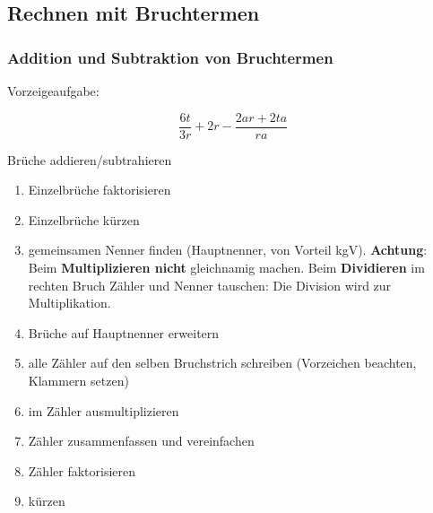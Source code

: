 \newpage
\subsection{Rechnen mit Bruchtermen}

\subsubsection{Addition und Subtraktion von Bruchtermen}

Vorzeigeaufgabe:

$$\frac{6t}{3r} + 2r - \frac{2ar+2ta}{ra}$$



\begin{rezept}{Brüche addieren/subtrahieren}{}\label{bruchtermeRezept}
\begin{enumerate}
	\item Einzelbrüche faktorisieren
	\item Einzelbrüche kürzen
	\item gemeinsamen Nenner finden (Hauptnenner, von Vorteil
	kgV). \textbf{Achtung}: Beim \textbf{Multiplizieren nicht}
	gleichnamig machen. Beim \textbf{Dividieren} im rechten Bruch Zähler
	und Nenner tauschen: Die Division wird zur Multiplikation.
	\item Brüche auf Hauptnenner erweitern
	\item alle Zähler auf den selben Bruchstrich schreiben (Vorzeichen beachten, Klammern setzen)
	\item im Zähler ausmultiplizieren
	\item Zähler zusammenfassen und vereinfachen
	\item Zähler faktorisieren
	\item kürzen
\end{enumerate}
\end{rezept}


